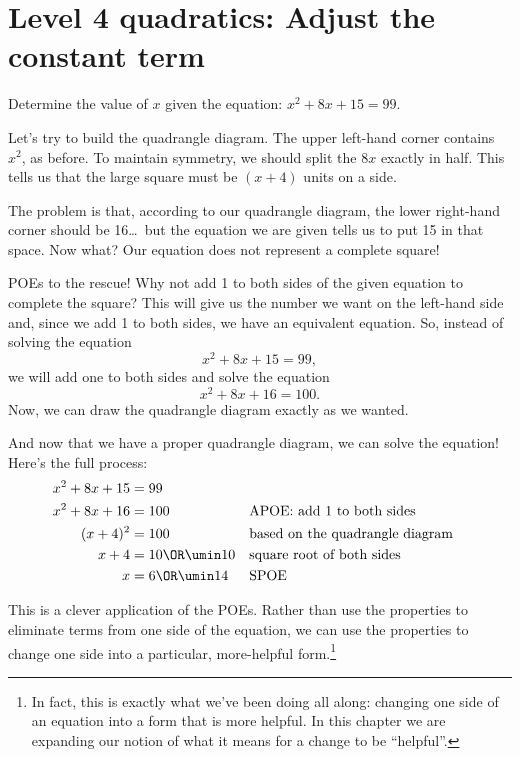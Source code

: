 \section{Level 4 quadratics: Adjust the constant term}

\begin{boxexplore}
Determine the value of $x$ given the equation: $x^2 + 8x + 15 = 99$.
\end{boxexplore} %

Let's try to build the quadrangle diagram. The upper left-hand corner contains $x^2$, as before. To maintain symmetry, we should split the $8x$ exactly in half. This tells us that the large square must be $(x+4)$ units on a side.


The problem is that, according to our quadrangle diagram, the lower right-hand corner should be 16\ldots\ but the equation we are given tells us to put 15 in that space. Now what? Our equation does not represent a complete square!


POEs to the rescue! Why not add 1 to both sides of the given equation to complete the square? This will give us the number we want on the left-hand side and, since we add 1 to both sides, we have an equivalent equation. So, instead of solving the equation
\[x^2 + 8x + 15 = 99,\]
we will add one to both sides and solve the equation
\[x^2 + 8x + 16 = 100.\]
Now, we can draw the quadrangle diagram exactly as we wanted.


And now that we have a proper quadrangle diagram, we can solve the equation! Here's the full process:
\begin{align*}
x^2 + 8x + 15 &= 99
\\
x^2 + 8x + 16 &= 100
&&\text{APOE: add 1 to both sides}
\\
(x+4)^2 &= 100
&&\text{based on the quadrangle diagram}
\\
x+4 &= 10 \OR \umin10
&&\text{square root of both sides}
\\
x &= 6 \OR \umin14
&&\text{SPOE}
\end{align*}

This is a clever application of the POEs. Rather than use the properties to eliminate terms from one side of the equation, we can use the properties to change one side into a particular, more-helpful form.\footnote{In fact, this is exactly what we've been doing all along: changing one side of an equation into a form that is more helpful. In this chapter we are expanding our notion of what it means for a change to be ``helpful''.}

